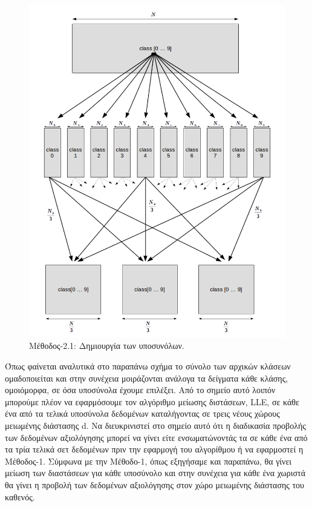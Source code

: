 \newpage
\clearpage
\begin{figure}[t!]
\centering
\includegraphics[scale=0.8]{figs/6.png}
\newline
\caption{ Μέθοδος-2.1: Δημιουργία των υποσυνόλων.} 
\end{figure}
\newpage
\par
Όπως φαίνεται αναλυτικά στο παραπάνω σχήμα το σύνολο των αρχικών κλάσεων ομαδοποιείται και στην συνέχεια μοιράζονται ανάλογα τα δείγματα κάθε κλάσης, ομοιόμορφα, σε όσα υποσύνολα έχουμε επιλέξει. Από το σημείο αυτό λοιπόν μπορούμε πλέον να εφαρμόσουμε τον αλγόριθμο μείωσης διστάσεων, \textlatin{LLE}, σε κάθε ένα από τα τελικά υποσύνολα δεδομένων καταλήγοντας σε τρεις νέους χώρους μειωμένης διάστασης \textlatin{d}. Να διευκρινιστεί στο σημείο αυτό ότι η διαδικασία προβολής των δεδομένων αξιολόγησης μπορεί να γίνει είτε ενσωματώνοντάς τα σε κάθε ένα από τα τρία τελικά σετ δεδομένων πριν την εφαρμογή του αλγορίθμου ή να εφαρμοστεί η Μέθοδος-1. Σύμφωνα με την Μέθοδο-1, όπως εξηγήσαμε και παραπάνω, θα γίνει μείωση των διαστάσεων για κάθε υποσύνολο και στην συνέχεια για κάθε ένα χωριστά θα γίνει η προβολή των δεδομένων αξιολόγησης στον χώρο μειωμένης διάστασης του καθενός. 
